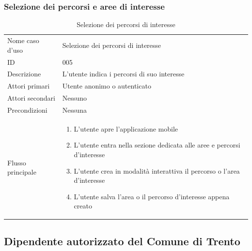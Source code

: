 \documentclass{article}
\begin{document}
\subsubsection{Selezione dei percorsi e aree di interesse}

\begin{table}[htbp]
    \label{8.2.4}
    \centering
    \begin{tabularx}{\textwidth}{| l | p{} |}
        \Xhline{2pt} %
        Nome caso d'uso & Selezione dei percorsi di interesse \\
        \Xhline{2pt} %
        ID & 005 \\
        \hline
        Descrizione & L'utente indica i percorsi di suo interesse\\
        \hline
        Attori primari & Utente anonimo o autenticato\\
        \hline
        Attori secondari & Nessuno \\
        \hline
        Precondizioni & Nessuna \\
        \hline
        Flusso principale & 
        \begin{enumerate}[topsep=5pt,partopsep=0pt,parsep=0pt,itemsep=0pt,before=\vspace{-\baselineskip},after=\vspace{-\baselineskip}]                
            \item L'utente apre l'applicazione mobile
            \item L'utente entra nella sezione dedicata alle aree e percorsi d'interesse
            \item L'utente crea in modalità interattiva il percorso o l'area d'interesse
            \item L'utente salva l'area o il percorso d'interesse appena creato
        \end{enumerate}
        \\
        \hline
    \end{tabularx}
    \caption{Selezione dei percorsi di interesse}
    \label{tab:tabella_use_case004}
\end{table}

\clearpage


\subsection{Dipendente autorizzato del Comune di Trento}
\end{document}
